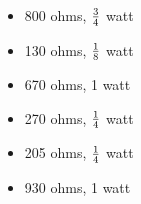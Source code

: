 \begin{itemize}
\item{} 800 ohms, $3 \over 4$ watt
\vskip 5pt
\item{} 130 ohms, $1 \over 8$ watt
\vskip 5pt
\item{} 670 ohms, 1 watt
\vskip 5pt
\item{} 270 ohms, $1 \over 4$ watt
\vskip 5pt
\item{} 205 ohms, $1 \over 4$ watt
\vskip 5pt
\item{} 930 ohms, 1 watt
\end{itemize}






